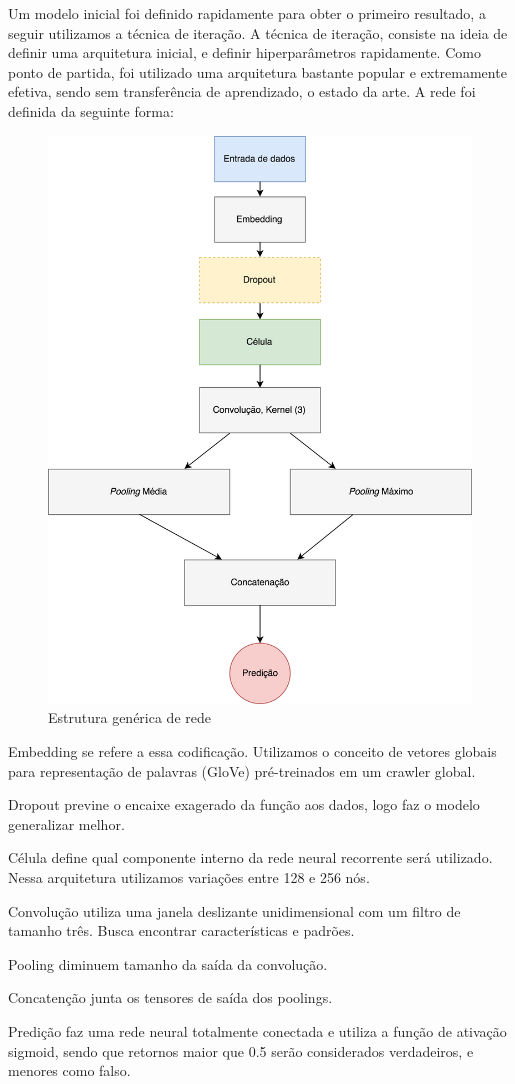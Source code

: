 \documentclass[12pt]{article}
\begin{document}
Um modelo inicial foi definido rapidamente para obter o primeiro resultado, a seguir utilizamos a técnica de iteração. A técnica de iteração, consiste na ideia de definir uma arquitetura inicial, e definir hiperparâmetros rapidamente. Como ponto de partida, foi utilizado uma arquitetura bastante popular e extremamente efetiva, sendo sem transferência de aprendizado, o estado da arte. A rede foi definida da seguinte forma:

\begin{figure}[ht]
\centering
\includegraphics[width=.5\textwidth]{images/graph.png}
\caption{Estrutura genérica de rede}
\label{fig:graph}
\end{figure}

Embedding se refere a essa codificação. Utilizamos o conceito de vetores globais para representação de palavras (GloVe) pré-treinados em um crawler global.

Dropout previne o encaixe exagerado da função aos dados, logo faz o modelo generalizar melhor.

Célula define qual componente interno da rede neural recorrente será utilizado. Nessa arquitetura utilizamos variações entre 128 e 256 nós.

Convolução utiliza uma janela deslizante unidimensional com um filtro de tamanho três. Busca encontrar características e padrões.

Pooling diminuem tamanho da saída da convolução.

Concatenção junta os tensores de saída dos poolings.

Predição faz uma rede neural totalmente conectada e utiliza a função de ativação sigmoid, sendo que retornos maior que 0.5 serão considerados verdadeiros, e menores como falso.
\end{document}
